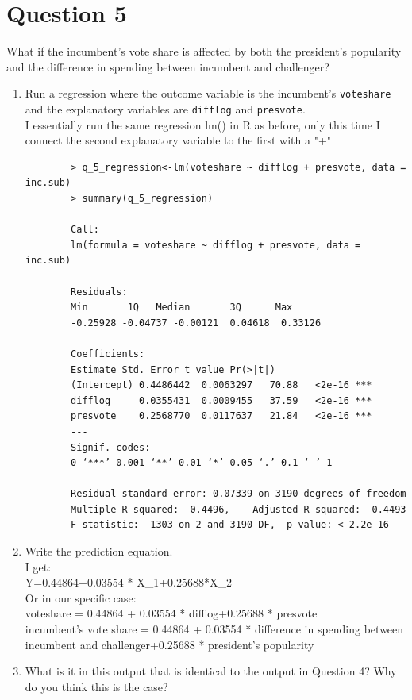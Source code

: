 \documentclass[12pt,letterpaper]{article}
\begin{document}
	\newpage	

\section*{Question 5}
\noindent What if the incumbent's vote share is affected by both the president's popularity and the difference in spending between incumbent and challenger? 
	\begin{enumerate}
		\item Run a regression where the outcome variable is the incumbent's \texttt{voteshare} and the explanatory variables are \texttt{difflog} and \texttt{presvote}.	\\
		
		I essentially run the same regression lm() in R as before, only this time I connect the second explanatory variable to the first with a "+"
		\begin{verbatim}
		> q_5_regression<-lm(voteshare ~ difflog + presvote, data = inc.sub)
		> summary(q_5_regression)
		
		Call:
		lm(formula = voteshare ~ difflog + presvote, data = inc.sub)
		
		Residuals:
		Min       1Q   Median       3Q      Max 
		-0.25928 -0.04737 -0.00121  0.04618  0.33126 
		
		Coefficients:
		Estimate Std. Error t value Pr(>|t|)    
		(Intercept) 0.4486442  0.0063297   70.88   <2e-16 ***
		difflog     0.0355431  0.0009455   37.59   <2e-16 ***
		presvote    0.2568770  0.0117637   21.84   <2e-16 ***
		---
		Signif. codes:  
		0 ‘***’ 0.001 ‘**’ 0.01 ‘*’ 0.05 ‘.’ 0.1 ‘ ’ 1
		
		Residual standard error: 0.07339 on 3190 degrees of freedom
		Multiple R-squared:  0.4496,	Adjusted R-squared:  0.4493 
		F-statistic:  1303 on 2 and 3190 DF,  p-value: < 2.2e-16
	\end{verbatim}
		\item Write the prediction equation.	\\
		
		I get: \\
		Y=0.44864+0.03554 * X\_1+0.25688*X\_2\\
		Or in our specific case: \\
		voteshare = 0.44864 + 0.03554 * difflog+0.25688 * presvote\\
		incumbent's vote share =  0.44864 + 0.03554 * difference in spending between incumbent and challenger+0.25688 * president's popularity \\
		\item What is it in this output that is identical to the output in Question 4? Why do you think this is the case? \\
		

\end{enumerate}
\end{document}
